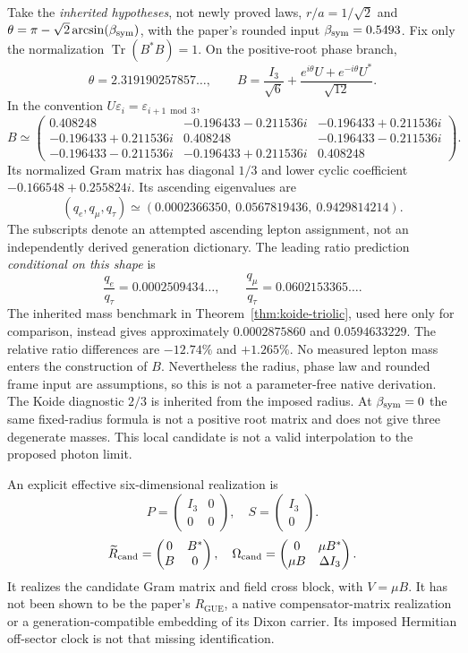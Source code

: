 Take the \emph{inherited hypotheses}, not newly proved laws,
$r/a=1/\sqrt2$ and
$\theta=\pi-\sqrt2\arcsin(\beta_{\mathrm{sym}})$, with the paper's rounded
input $\beta_{\mathrm{sym}}=0.5493$. Fix only the normalization
$\operatorname{Tr}(B^*B)=1$. On the positive-root phase branch,
\[
 \theta=2.319190257857\ldots,\qquad
 B=\frac{I_3}{\sqrt6}
   +\frac{e^{i\theta}U+e^{-i\theta}U^*}{\sqrt{12}}.
\]
In the convention $U\varepsilon_i=\varepsilon_{i+1\bmod3}$,
\[
 B\simeq
 \begin{pmatrix}
  0.408248&-0.196433-0.211536i&-0.196433+0.211536i\\
  -0.196433+0.211536i&0.408248&-0.196433-0.211536i\\
  -0.196433-0.211536i&-0.196433+0.211536i&0.408248
 \end{pmatrix}.
\]
Its normalized Gram matrix has diagonal $1/3$ and lower cyclic
coefficient $-0.166548+0.255824i$. Its ascending eigenvalues are
\[
 (q_e,q_\mu,q_\tau)
 \simeq(0.0002366350,\ 0.0567819436,\ 0.9429814214).
\]
The subscripts denote an attempted ascending lepton assignment,
not an independently derived generation dictionary. The leading
ratio prediction \emph{conditional on this shape} is
\[
 \frac{q_e}{q_\tau}=0.0002509434\ldots,\qquad
 \frac{q_\mu}{q_\tau}=0.0602153365\ldots.
\]
The inherited mass benchmark in Theorem~\ref{thm:koide-triolic},
used here only for comparison, instead gives approximately
$0.0002875860$ and $0.0594633229$. The relative ratio differences
are $-12.74\%$ and $+1.265\%$. No measured lepton mass enters
the construction of $B$. Nevertheless the radius, phase law and
rounded frame input are assumptions, so this is not a parameter-free
native derivation. The Koide diagnostic $2/3$ is inherited from the
imposed radius.
At $\beta_{\mathrm{sym}}=0$ the same fixed-radius formula is not a positive root
matrix and does not give three degenerate masses. This local candidate
is not a valid interpolation to the proposed photon limit.

An explicit effective six-dimensional realization is
\[
 P=\begin{pmatrix}I_3&0\\0&0\end{pmatrix},\quad
 S=\begin{pmatrix}I_3\\0\end{pmatrix}.
\]
\[
 \widetilde R_{\rm cand}=\begin{pmatrix}0&B^*\\B&0\end{pmatrix},
 \quad
 \Omega_{\rm cand}=\begin{pmatrix}0&\mu B^*\\\mu B&\Delta I_3\end{pmatrix}.
\]
It realizes the candidate Gram matrix and field cross block, with
$V=\mu B$. It has not been shown to be the paper's
$R_{\mathrm{GUE}}$, a native compensator-matrix realization or a
generation-compatible embedding of its Dixon carrier. Its imposed
Hermitian off-sector clock is not that missing identification.

